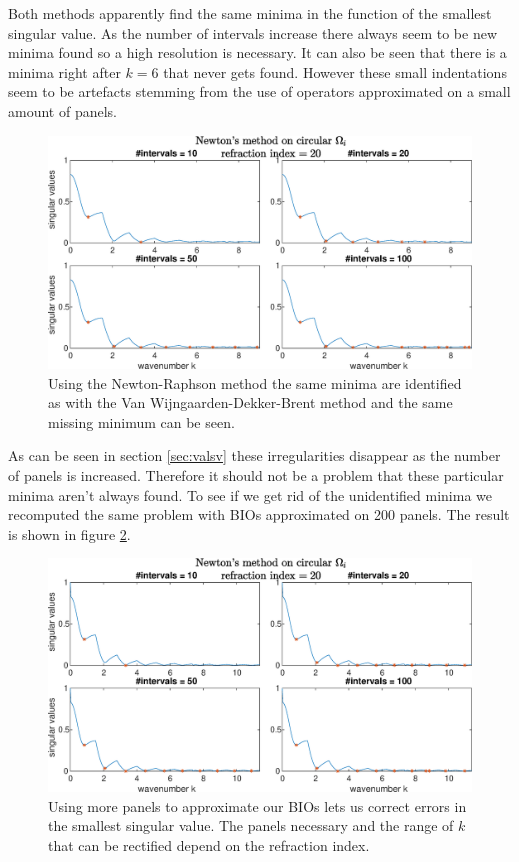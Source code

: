 \documentclass[a4paper, oneside]{discothesis}
\begin{document}
Both methods apparently find the same minima in the function of the smallest singular value.
As the number of intervals increase there always seem to be new minima found so a high resolution is necessary.
It can also be seen that there is a minima right after $k=6$ that never gets found.
However these small indentations seem to be artefacts stemming from the use of operators approximated on a small amount of panels.
\begin{figure} [H]
	\centering
	\includegraphics[width=\columnwidth]{figures/roots_newton_circle_50_20.eps}
	\caption{
		Using the Newton-Raphson method the same minima are identified as with the Van Wijngaarden-Dekker-Brent method and the same missing minimum can be seen.
	}
	\label{fig:roots_newton_circle_50_20}
\end{figure}
As can be seen in section \ref{sec:valsv} these irregularities disappear as the number of panels is increased.
Therefore it should not be a problem that these particular minima aren't always found.
To see if we get rid of the unidentified minima we recomputed the same problem with BIOs approximated on 200 panels.
The result is shown in figure \ref{fig:roots_newton_circle_200_20}.
\begin{figure} [H]
	\centering
	\includegraphics[width=\columnwidth]{figures/roots_newton_circle_200_20.eps}
	\caption{
		Using more panels to approximate our BIOs lets us correct errors in the smallest singular value.
		The panels necessary and the range of $k$ that can be rectified depend on the refraction index.
	}
	\label{fig:roots_newton_circle_200_20}
\end{figure}
\end{document}

